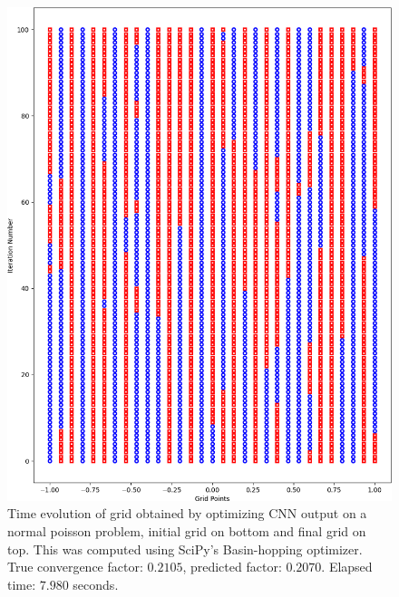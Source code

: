 \begin{figure}[h]
  \centering
  \includegraphics[scale=0.7]{figures/grid-opt/poisson_unitary_grid_time.png}
  \caption{Time evolution of grid obtained by optimizing CNN output on a normal poisson problem, initial grid on bottom and final grid on top.  This was computed using SciPy's Basin-hopping optimizer.  True convergence factor: $0.2105$, predicted factor: $0.2070$.  Elapsed time: $7.980$ seconds.  }
  \label{fig:optimized_grid_poisson}
\end{figure}

